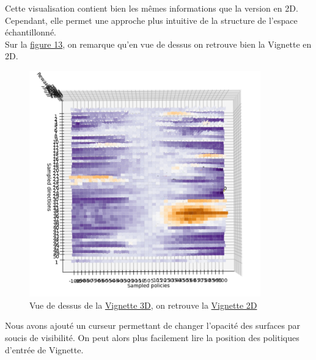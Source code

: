 \documentclass[12pt]{article}
\begin{document}
Cette visualisation contient bien les mêmes informations que la version en 2D. Cependant, elle permet une approche plus intuitive de la structure de l'espace échantillonné. \\

Sur la \hyperref[fig:vignetteDessus]{figure 13}, on remarque qu'en vue de dessus on retrouve bien la Vignette en 2D. \\

\begin{figure}[htp]
    \centering
    \includegraphics[width=10cm]{Images/vignette_dessus}
    \caption{Vue de dessus de la \hyperref[fig:vignette3D]{Vignette 3D}, on retrouve la \hyperref[fig:vignettePendulum]{Vignette 2D}}
    \label{fig:vignetteDessus}
\end{figure}

\newpage
Nous avons ajouté un curseur permettant de changer l'opacité des surfaces par soucis de visibilité. On peut alors plus facilement lire la position des politiques d'entrée de Vignette. \\
\end{document}
